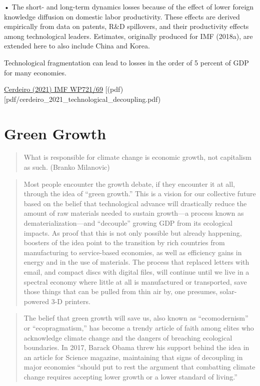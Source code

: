 \documentclass[
]{book}
\begin{document}
• The short- and long-term dynamics losses because of the effect of lower foreign
knowledge diffusion on domestic labor productivity. These effects are derived empirically
from data on patents, R\&D spillovers, and their productivity effects among technological
leaders. Estimates, originally produced for IMF (2018a), are extended here to also
include China and Korea.

Technological fragmentation can lead to losses in the order of 5 percent of GDP for many economies.

\href{https://www.imf.org/en/Publications/WP/Issues/2021/03/12/Sizing-Up-the-Effects-of-Technological-Decoupling-50125}{Cerdeiro (2021) IMF WP721/69}
{[}(pdf){[}pdf/cerdeiro\_2021\_technological\_decoupling.pdf)

\hypertarget{green-growth}{%
\chapter{Green Growth}\label{green-growth}}

\begin{quote}
What is responsible for climate change is economic growth, not capitalism as such. (Branko Milanovic)
\end{quote}

\begin{quote}
Most people encounter the growth debate, if they encounter it at all, through the idea of ``green growth.'' This is a vision for our collective future based on the belief that technological advance will drastically reduce the amount of raw materials needed to sustain growth---a process known as dematerialization---and ``decouple'' growing GDP from its ecological impacts. As proof that this is not only possible but already happening, boosters of the idea point to the transition by rich countries from manufacturing to service-based economies, as well as efficiency gains in energy and in the use of materials. The process that replaced letters with email, and compact discs with digital files, will continue until we live in a spectral economy where little at all is manufactured or transported, save those things that can be pulled from thin air by, one presumes, solar-powered 3-D printers.
\end{quote}

\begin{quote}
The belief that green growth will save us, also known as ``ecomodernism'' or ``ecopragmatism,'' has become a trendy article of faith among elites who acknowledge climate change and the dangers of breaching ecological boundaries. In 2017, Barack Obama threw his support behind the idea in an article for Science magazine, maintaining that signs of decoupling in major economies ``should put to rest the argument that combatting climate change requires accepting lower growth or a lower standard of living.''
\end{quote}
\end{document}
